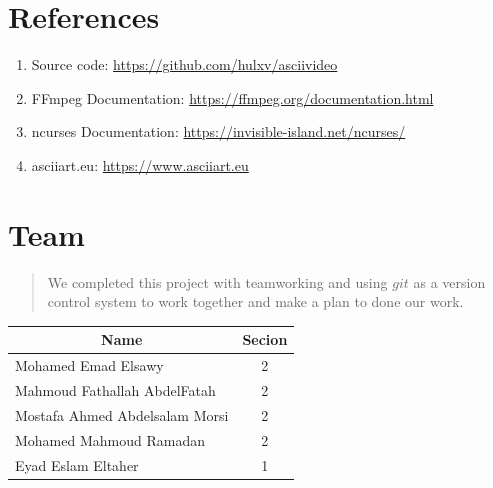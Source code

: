 \documentclass[a4paper,12pt]{article}
\begin{document}
\section{References}
\begin{enumerate}
    \item Source code: \url{https://github.com/hulxv/asciivideo}
    \item FFmpeg Documentation: \url{https://ffmpeg.org/documentation.html}
    \item ncurses Documentation: \url{https://invisible-island.net/ncurses/}
    \item asciiart.eu: \url{https://www.asciiart.eu}
\end{enumerate}


\newpage

\section{Team}
\begin{quote}
    
    We completed this project with teamworking and using $git$ as a version control system to work together and make a plan to done our work.
\end{quote}

    
\begin{table}[]
    \centering
    \Large
\begin{tabular}{@{}lc@{}}
\multicolumn{1}{c}{Name}       & Secion \\ 
\hline
Mohamed Emad Elsawy            & 2      \\
Mahmoud Fathallah AbdelFatah   & 2      \\
Mostafa Ahmed Abdelsalam Morsi & 2      \\
Mohamed Mahmoud Ramadan        & 2      \\
Eyad Eslam Eltaher             & 1      \\ 
\end{tabular}
\end{table}
    
\end{document}
